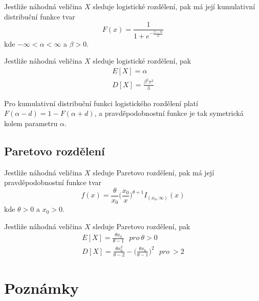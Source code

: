 \begin{definition}
Jestliže náhodná veličina $X$ sleduje logistické rozdělení, pak má její kumulativní distribuční funkce tvar
\begin{equation*}
F(x) = \frac{1}{1 + e^{- \frac{x - \alpha}{\beta}}}
\end{equation*}
kde $-\infty < \alpha < \infty$ a $\beta > 0$.
\end{definition}

\begin{theorem}
Jestliže náhodná veličina $X$ sleduje logistické rozdělení, pak
\begin{gather*}
E[X] =  \alpha\\
D[X] = \frac{\beta^2 \pi^2}{3}
\end{gather*}
\end{theorem}

Pro kumulativní distribuční funkci logistického rozdělení platí $F(\alpha - d) = 1 - F(\alpha + d)$, a pravděpodobnostní funkce je tak symetrická kolem parametru $\alpha$.

\subsection{Paretovo rozdělení}

\begin{definition}
Jestliže náhodná veličina $X$ sleduje Paretovo rozdělení, pak má její pravděpodobnostní funkce tvar
\begin{equation*}
f(x) = \frac{\theta}{x_0} \Big(\frac{x_0}{x}\Big)^{\theta + 1}I_{(x_0, \infty)}(x)
\end{equation*}
kde $\theta > 0$ a $x_0 > 0$.
\end{definition}

\begin{theorem}
Jestliže náhodná veličina $X$ sleduje Paretovo rozdělení, pak
\begin{gather*}
E[X] = \frac{\theta x_0}{\theta - 1}~~~ \textit{pro}~ \theta > 0\\
D[X] = \frac{\theta x_0^2}{\theta - 2} - \Big(\frac{\theta x_0}{\theta - 1} \Big)^2 ~~~ \textit{pro}~  > 2
\end{gather*}
\end{theorem}

\section{Poznámky}

